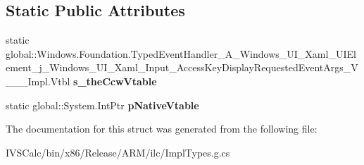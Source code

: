 \subsection*{Static Public Attributes}
\begin{DoxyCompactItemize}
\item 
\mbox{\label{struct_windows_1_1_foundation_1_1_typed_event_handler___a___windows___u_i___xaml___u_i_element__0a74a57359b62166d706be96094573e6_a2b491cf2e67744051ea50d68cdbdb5be}} 
static global\+::\+Windows.\+Foundation.\+Typed\+Event\+Handler\+\_\+\+A\+\_\+\+Windows\+\_\+\+U\+I\+\_\+\+Xaml\+\_\+\+U\+I\+Element\+\_\+j\+\_\+\+Windows\+\_\+\+U\+I\+\_\+\+Xaml\+\_\+\+Input\+\_\+\+Access\+Key\+Display\+Requested\+Event\+Args\+\_\+\+V\+\_\+\+\_\+\+\_\+\+Impl.\+Vtbl {\bfseries s\+\_\+the\+Ccw\+Vtable}
\item 
\mbox{\label{struct_windows_1_1_foundation_1_1_typed_event_handler___a___windows___u_i___xaml___u_i_element__0a74a57359b62166d706be96094573e6_a8c42c58fe3720aa522f5e328434284ec}} 
static global\+::\+System.\+Int\+Ptr {\bfseries p\+Native\+Vtable}
\end{DoxyCompactItemize}


The documentation for this struct was generated from the following file\+:\begin{DoxyCompactItemize}
\item 
I\+V\+S\+Calc/bin/x86/\+Release/\+A\+R\+M/ilc/Impl\+Types.\+g.\+cs\end{DoxyCompactItemize}
